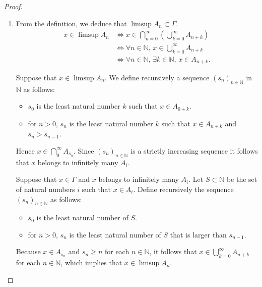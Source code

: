 \begin{proof}
	\begin{enumerate}[label={(\alph*)}, leftmargin=*]
		\item From the definition, we deduce that \( \limsup A_{n} \subset \Gamma \).
		      \begingroup
		      \allowdisplaybreaks%
		      \begin{align*}
			      x \in \limsup A_{n} & \iff x \in \bigcap^{\infty}_{n=0} \left(\bigcup^{\infty}_{k=0} A_{n+k}\right) \\
			                          & \iff \forall n \in \mathbb{N},\,x \in \bigcup^{\infty}_{k=0} A_{n+k}          \\
			                          & \iff \forall n \in \mathbb{N},\, \exists k \in \mathbb{N},\, x \in A_{n+k}.
		      \end{align*}
		      \endgroup

		      Suppose that \( x \in \limsup A_{n} \). We define recursively a sequence \( {(s_{n})}_{n\in\mathbb{N}} \) in \( \mathbb{N} \) as follows:
		      \begin{itemize}
			      \item $s_{0}$ is the least natural number \( k \) such that \( x \in A_{0 + k} \).
			      \item for \( n > 0 \), \( s_{n} \) is the least natural number \( k \) such that \( x \in A_{n+k} \) and \( s_{n} > s_{n-1} \).
		      \end{itemize}

		      Hence \( x \in \displaystyle\bigcap^{\infty}_{0} A_{s_{n}} \). Since \( {(s_{n})}_{n\in\mathbb{N}} \) is a strictly increasing sequence it follows that \( x \) belongs to infinitely many \( A_{i} \).

		      Suppose that \( x \in \Gamma \) and \( x \) belongs to infinitely many \( A_{i} \). Let \( S \subset \mathbb{N} \) be the set of natural numbers \( i \) such that \( x \in A_{i} \). Define recursively the sequence \( {(s_{n})}_{n\in\mathbb{N}} \) as follows:
		      \begin{itemize}
			      \item \( s_{0} \) is the least natural number of \( S \).
			      \item for \( n > 0 \), \( s_{n} \) is the least natural number of \( S \) that is larger than \( s_{n-1} \).
		      \end{itemize}

		      Because \( x \in A_{s_{n}} \) and \( s_{n} \geq n \) for each \( n \in \mathbb{N} \), it follows that \( x \in \displaystyle\bigcup^{\infty}_{k=0}A_{n+k} \) for each \( n \in \mathbb{N} \), which implies that \( x \in \limsup A_{n} \).


\end{enumerate}
\end{proof}
